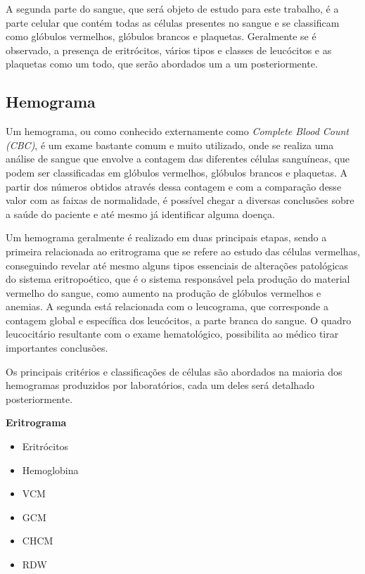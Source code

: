 A segunda parte do sangue, que será objeto de estudo para este trabalho, é a parte celular que contém todas as células presentes no sangue e se classificam como glóbulos vermelhos, glóbulos brancos e plaquetas. Geralmente se é observado, a presença de eritrócitos, vários tipos e classes de leucócitos e as plaquetas como um todo, que serão abordados um a um posteriormente.

\subsection{Hemograma}
Um hemograma, ou como conhecido externamente como \emph{Complete Blood Count (CBC)}, é um exame bastante comum e muito utilizado, onde se realiza uma análise de sangue que envolve a contagem das diferentes células sanguíneas, que podem ser classificadas em glóbulos vermelhos, glóbulos brancos e plaquetas. A partir dos números obtidos através dessa contagem e com a comparação desse valor com as faixas de normalidade, é possível chegar a diversas conclusões sobre a saúde do paciente e até mesmo já identificar alguma doença.

Um hemograma geralmente é realizado em duas principais etapas, sendo a primeira relacionada ao eritrograma que se refere ao estudo das células vermelhas, conseguindo revelar até mesmo alguns tipos essenciais de alterações patológicas do sistema eritropoético, que é o sistema responsável pela produção do material vermelho do sangue, como aumento na produção de glóbulos vermelhos e anemias. A segunda está relacionada com o leucograma, que corresponde a contagem global e específica dos leucócitos, a parte branca do sangue. O quadro leucocitário resultante com o exame hematológico, possibilita ao médico tirar importantes conclusões.

Os principais critérios e classificações de células são abordados na maioria dos hemogramas produzidos por laboratórios, cada um deles será detalhado posteriormente.

\textbf{Eritrograma}
\begin{itemize}
    \item Eritrócitos
    \item Hemoglobina
    \item VCM
    \item GCM
    \item CHCM
    \item RDW
\end{itemize}

